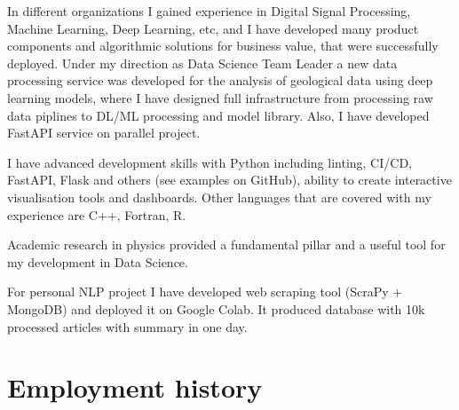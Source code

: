 \documentclass[10pt,a4paper]{article}
\newcommand{\verticalSpace}{0.3cm}
\begin{document}
In different organizations I gained experience in Digital Signal Processing, Machine Learning, Deep Learning, etc, and I have developed many product components and algorithmic solutions for business value, that were successfully deployed.
Under my direction as Data Science Team Leader a new data processing service was developed for the analysis of geological data using deep learning models, where I have designed full infrastructure from processing raw data piplines to DL/ML processing and model library.
Also, I have developed FastAPI service on parallel project. 


I have advanced development skills with Python including linting, CI/CD, FastAPI, Flask and others (see examples on GitHub), ability to create interactive visualisation tools and dashboards.
Other languages that are covered with my experience are C++, Fortran, R.

Academic research in physics provided a fundamental pillar and a useful tool for my development in Data Science.

For personal NLP project I have developed web scraping tool (ScraPy + MongoDB) and deployed it on Google Colab.
It produced database with 10k processed articles with summary in one day.



	\setlength{\parindent}{0em}
	\vspace{\verticalSpace}
	\section*{Employment history}
 
\end{document}
